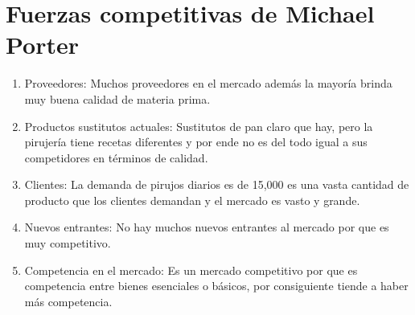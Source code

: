 \documentclass{article}
\begin{document}
\section{Fuerzas competitivas de Michael Porter}
\begin{enumerate}
    \item Proveedores: Muchos proveedores en el mercado además la mayoría brinda muy buena calidad de materia prima. 
    \item Productos sustitutos actuales: Sustitutos de pan claro que hay, pero la pirujería tiene recetas diferentes y por ende no es del todo igual a sus competidores en términos de calidad. 
    \item Clientes: La demanda de pirujos diarios es de 15,000 es una vasta cantidad de producto que los clientes demandan y el mercado es vasto y grande. 
    \item Nuevos entrantes: No hay muchos nuevos entrantes al mercado por que es muy competitivo. 
    \item Competencia en el mercado: Es un mercado competitivo por que es competencia entre bienes esenciales o básicos, por consiguiente tiende a haber más competencia. 
\end{enumerate}




\end{document}

